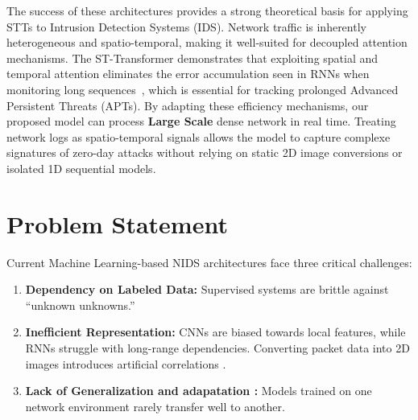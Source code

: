 \documentclass[12pt, a4paper]{report}
\begin{document}
\begin{itemize}



The success of these architectures provides a strong theoretical basis for applying STTs to Intrusion Detection Systems (IDS). Network traffic is inherently heterogeneous and spatio-temporal, making it well-suited for decoupled attention mechanisms. The ST-Transformer demonstrates that exploiting spatial and temporal attention eliminates the error accumulation seen in RNNs when monitoring long sequences~\cite{aksan2020spatio}, which is essential for tracking prolonged Advanced Persistent Threats (APTs). By adapting these efficiency mechanisms, our proposed model can process \textbf{Large Scale}  dense network  in real time. Treating network logs as spatio-temporal signals allows the model to capture complexe signatures of zero-day attacks without relying on static 2D image conversions or isolated 1D sequential models.
\end{itemize} 
\section*{Problem Statement}
Current Machine Learning-based NIDS architectures face three critical challenges:
\begin{enumerate}
    \item \textbf{Dependency on Labeled Data:} Supervised systems are brittle against ``unknown unknowns.''
    \item \textbf{Inefficient Representation:} CNNs are biased towards local features, while RNNs struggle with long-range dependencies. Converting packet data into 2D images introduces artificial correlations \cite{luisbisbe2024nopictures}.
    \item \textbf{Lack of Generalization and adapatation :} Models trained on one network environment rarely transfer well to another.

   
\end{enumerate}
\end{document}
